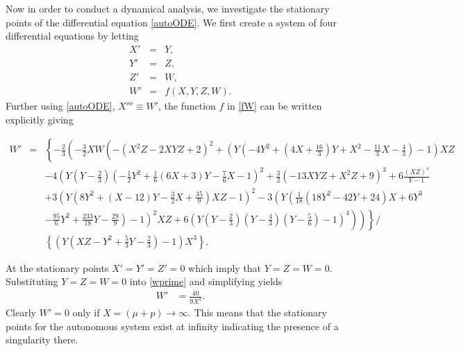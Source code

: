 \documentclass[abstract=on,notitlepage,superscriptaddress,nofootinbib,aps,showpacs,twocolumn,prd]{revtex4}
\newcommand{\0}{^{(0)}}
\newcommand{\1}{^{(1)}}
\newcommand{\2}{^{(2)}}
\newcommand{\3}{{}^{(3)}}
\begin{document}
Now in order to conduct a dynamical analysis, we investigate the stationary points of the differential equation \eqref{autoODE}. We first create a system of four differential equations by letting 
\begin{eqnarray}
    X' &=& Y, \nonumber\\
     Y' &=& Z, \nonumber\\
     Z' &=& W, \nonumber\\
    \label{fW}
    W' &=&f(X,Y,Z,W). 
\end{eqnarray}
Further using \eqref{autoODE}, $X''' \equiv W'$, the function $f$ in \eqref{fW} can be written explicitly giving
\begin{widetext}
\begin{eqnarray}
    W'  &=& \left\{-\frac{2}{3} \left(  -\frac{3}{2}X W   \left( - \left(X^2 Z   -2XYZ   +2 \right) ^{2} + \left( Y  
 \left( -4  Y  ^{2}+ \left( 4X +\frac{16}{3}\right) Y +  X ^{2}-\frac{11}{3}X  -\frac{4}{3}\right) -1\right) X  Z \right. \right.   \right. \nonumber\\
  &&    -4 \left( Y   \left( Y  -\frac{2}{3}
 \right)  \left( -\frac{1}{2} Y ^{2}+\frac{1}{6}\left( 6X  +3 \right) Y \right. -\frac{7}{6}X  -1\right)^{2} +\frac{3}{2} \left( 
-13XYZ +X^2 Z +9 \right)^{3}+6\frac { \left( XZ \right)^{4}}{Y  -1}  \nonumber\\
 &&+3 \left( Y \left( 8 Y ^{2}+ \left( X  -12 \right) Y  -\frac{3}{2}X
 +{\frac {35}{9}} \right) XZ -1 \right) ^{2} -3 \left( Y
   \left( \frac{1}{18} \left( 18 Y ^{2}-42Y  +24 \right) X  +6 Y^{3} \right. \right. \nonumber\\
&&\left. \left. \left. \left. \left. -{\frac {95}
{6}} Y ^{2}+\frac {233}{18}Y
  -\frac {29}{9} \right) -1 \right) ^{2}X  Z  +6 \left( Y  
 \left( Y  -\frac{2}{3}\right) \left( Y  -\frac{4}{3} \right)  \left( Y  -\frac{5}{6}\right)-1\right)^{4}\right)\right)\right\}   \Bigg/   \nonumber\\
 && \left\{  \left( Y   \left( X Z  -  Y ^{2}+\frac{5}{3}Y  -\frac{2}{3} \right) -1 \right)X^3\right\}.\label{wprime}
\end{eqnarray}
\end{widetext}
At the stationary points $X'=Y'=Z'=0$ which imply that $Y=Z=W=0$. Substituting $Y=Z=W=0$ into \eqref{wprime} and simplifying yields
\begin{align}
    W' &= \frac{40}{9X^3}.
\end{align}
Clearly $W'=0$ only if $X = (\mu+p) \to \infty$. This means that the stationary points for the autonomous system exist at infinity indicating the presence of a singularity there. 
\end{document}
